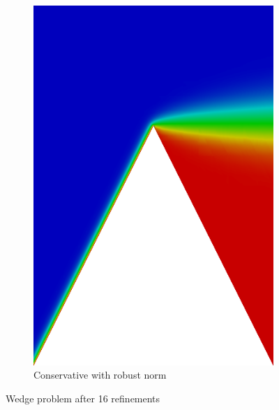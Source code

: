 \documentclass[letterpaper]{article}
\begin{document}
\begin{figure}
\begin{subfigure}[t]{0.4\textwidth}
\includegraphics[width=\textwidth]{figs/Wedge/robust16c.png}
\caption{Conservative with robust norm}
\label{fig:wedgeRobust16c}
\end{subfigure}
\caption{Wedge problem after 16 refinements}
\label{fig:wedge}
\end{figure}
\end{document}
